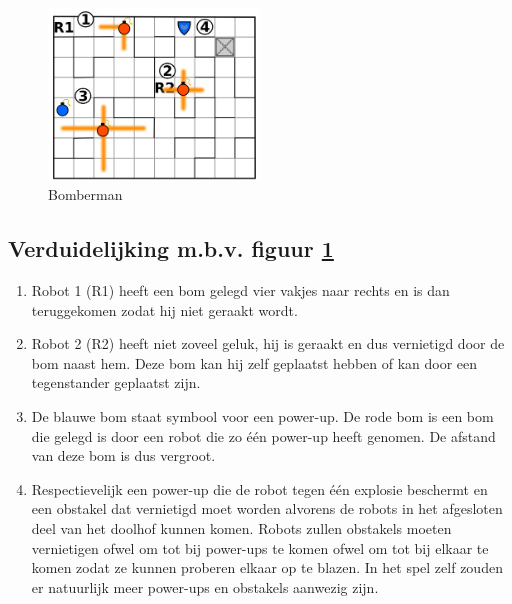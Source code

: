 \documentclass[t1]{penoverslag}
\begin{document}
\begin{figure}[h!]
  \centering
    \includegraphics[width=0.5\textwidth]{bomberman}
    \caption{Bomberman}
  \label{fig:bomberman}
\end{figure}

\subsection{Verduidelijking m.b.v. figuur \ref{fig:bomberman}}
\begin{enumerate}
\item
Robot 1 (R1) heeft een bom gelegd vier vakjes naar rechts en is dan teruggekomen zodat hij niet geraakt wordt.

\item
Robot 2 (R2) heeft niet zoveel geluk, hij is geraakt en  dus vernietigd door de bom naast hem. Deze bom kan hij zelf geplaatst hebben of kan door een tegenstander geplaatst zijn.

\item
De blauwe bom staat symbool voor een power-up. De rode bom is een bom die gelegd is door een robot die zo \'e\'en power-up heeft genomen. De afstand van deze bom is dus vergroot.

\item
Respectievelijk een power-up die de robot tegen \'e\'en explosie beschermt en een obstakel dat vernietigd moet worden alvorens de robots in het afgesloten deel van het doolhof kunnen komen. Robots zullen obstakels moeten vernietigen ofwel om tot bij power-ups te komen ofwel om tot bij elkaar te komen zodat ze kunnen proberen elkaar op te blazen. In het spel zelf zouden er natuurlijk meer power-ups en obstakels aanwezig zijn.
\end{enumerate}

\newpage
\end{document}
